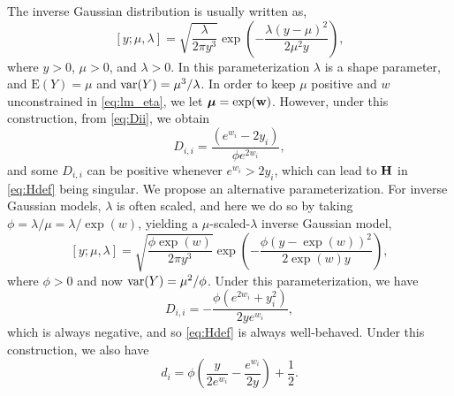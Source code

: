 \documentclass[12pt, titlepage]{article}
\begin{document}
\noindent{} The inverse Gaussian distribution is usually written as,
\begin{equation} \label{eq:IGdist}
[y;\mu,\lambda] = 
\sqrt{\frac{\lambda}{2\pi y^{3}}}\exp\left(-\frac{\lambda(y - \mu)^{2}}{2\mu^{2} y}\right),
\end{equation}
where $y > 0$, $\mu > 0$, and $\lambda > 0$. In this parameterization $\lambda$ is a shape parameter, and $\textrm{E}(Y) = \mu$ and $\textrm{var}(Y) = \mu^{3}/\lambda$.  In order to keep $\mu$ positive and $w$ unconstrained in \eqref{eq:lm_eta}, we let $\boldsymbol{\mu} = \exp(\mathbf{w})$.  However, under this construction, from \eqref{eq:Dii}, we obtain
$$
D_{i,i} = \frac{(e^{w_{i}} - 2 y_{i})}{\phi e^{2 w_{i}} },
$$
and some $D_{i,i}$ can be positive whenever $e^{w_{i}} > 2y_{i}$, which can lead to $\mathbf{H}$ in \eqref{eq:Hdef} being singular.  We propose an alternative parameterization.  For inverse Gaussian models, $\lambda$ is often scaled, and here we do so by taking $\phi = \lambda/\mu = \lambda/\exp(w)$, yielding a $\mu$-scaled-$\lambda$ inverse Gaussian model,
\begin{equation} \label{eq:phiIGdist}
[y;\mu,\lambda] = 
\sqrt{\frac{\phi\exp(w)}{2\pi y^{3}}}\exp\left(-\frac{\phi(y - \exp(w))^{2}}{2\exp(w) y}\right),
\end{equation}
where $\phi > 0$ and now $\textrm{var}(Y) = \mu^{2}/\phi$.  Under this parameterization, we have
$$
D_{i,i} = -\frac{\phi(e^{2w_{i}} + y_{i}^{2})}{2 y e^{w_{i}} },
$$
which is always negative, and so \eqref{eq:Hdef} is always well-behaved.  Under this construction, we also have
$$
d_{i} = \phi\left(\frac{y}{2e^{w_{i}}} - \frac{ e^{w_{i}}}{2y}\right) + \frac{1}{2}.
$$


\end{document}
